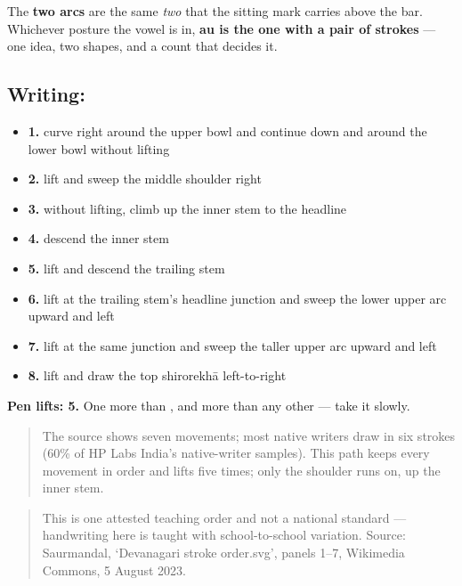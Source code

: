 The \textbf{two arcs} are the same \emph{two} that the sitting mark carries above the bar. Whichever posture the vowel is in, \textbf{au is the one with a pair of strokes} — one idea, two shapes, and a count that decides it.

\subsection*{Writing: }

\begin{itemize}
\raggedright
  \item \textbf{1.} curve right around the upper bowl and continue down and around the lower bowl without lifting
  \item \textbf{2.} lift and sweep the middle shoulder right
  \item \textbf{3.} without lifting, climb up the inner stem to the headline
  \item \textbf{4.} descend the inner stem
  \item \textbf{5.} lift and descend the trailing stem
  \item \textbf{6.} lift at the trailing stem's headline junction and sweep the lower upper arc upward and left
  \item \textbf{7.} lift at the same junction and sweep the taller upper arc upward and left
  \item \textbf{8.} lift and draw the top shirorekhā left-to-right
\end{itemize}

\textbf{Pen lifts: 5.} One more than \textbf{}, and more than any other — take it slowly.

\begin{quote}
The source shows seven movements; most native writers draw  in six strokes (60\% of HP Labs India's native-writer samples). This path keeps every movement in order and lifts five times; only the shoulder runs on, up the inner stem.
\end{quote}

\begin{quote}
This is one attested teaching order and not a national standard — handwriting here is taught with school-to-school variation. Source: Saurmandal, ‘Devanagari  stroke order.svg’, panels 1–7, Wikimedia Commons, 5 August 2023.
\end{quote}

